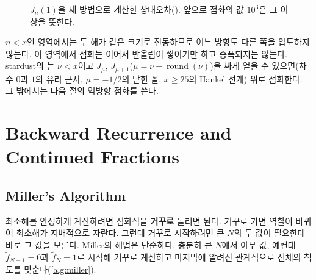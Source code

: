 \begin{figure}[htbp]
\centering
{}
\caption{$J_n(1)$을 세 방법으로 계산한 상대오차(). 앞으로 점화의 값 $10^3$은 그 이상을 뜻한다.}
\label{fig:bessel-dir}
\end{figure}

$n<x$인 영역에서는 두 해가 같은 크기로 진동하므로 어느 방향도 다른 쪽을 압도하지 않는다. 이 영역에서 점화는 이어서 반올림이 쌓이기만 하고 증폭되지는 않는다. stardust의 는 $\nu<x$이고 $J_\mu$, $J_{\mu+1}$($\mu=\nu-\operatorname{round}(\nu)$)을 싸게 얻을 수 있으면(차수 $0$과 $1$의 유리 근사, $\mu=-1/2$의 닫힌 꼴, $x\ge25$의 Hankel 전개) 위로 점화한다. 그 밖에서는 다음 절의 역방향 점화를 쓴다.


\section{Backward Recurrence and Continued Fractions}
\label{sec:miller}

\subsection{Miller's Algorithm}

최소해를 안정하게 계산하려면 점화식을 \textbf{거꾸로} 돌리면 된다. 거꾸로 가면 역할이 바뀌어 최소해가 지배적으로 자란다. 그런데 거꾸로 시작하려면 큰 $N$의 두 값이 필요한데 바로 그 값을 모른다. Miller의 해법은 단순하다. 충분히 큰 $N$에서 아무 값, 예컨대 $\tilde f_{N+1}=0$과 $\tilde f_N=1$로 시작해 거꾸로 계산하고 마지막에 알려진 관계식으로 전체의 척도를 맞춘다(\cref{alg:miller}).

